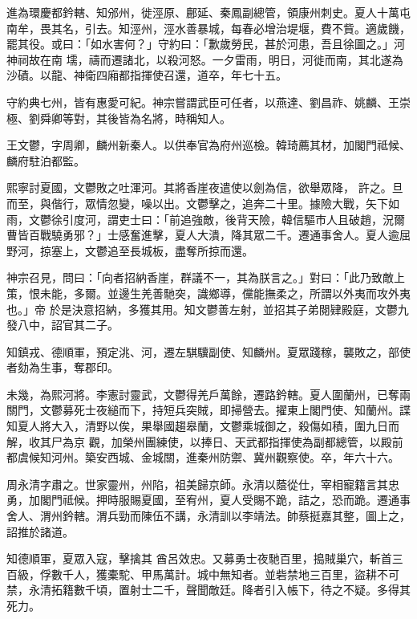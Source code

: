 \begin{pinyinscope}
 進為環慶都鈐轄、知邠州，徙涇原、鄜延、秦鳳副總管，領康州刺史。夏人十萬屯南牟，畏其名，引去。知涇州，涇水善暴城，每春必增治堤堰，費不貲。適歲饑，罷其役。或曰：「如水害何？」守約曰：「歉歲勞民，甚於河患，吾且徐圖之。」河神祠故在南
 壖，禱而遷諸北，以殺河怒。一夕雷雨，明日，河徙而南，其北遂為沙磧。以龍、神衛四廂都指揮使召還，道卒，年七十五。



 守約典七州，皆有惠愛可紀。神宗嘗謂武臣可任者，以燕達、劉昌祚、姚麟、王崇極、劉舜卿等對，其後皆為名將，時稱知人。



 王文鬱，字周卿，麟州新秦人。以供奉官為府州巡檢。韓琦薦其材，加閣門祗候、麟府駐泊都監。



 熙寧討夏國，文鬱敗之吐渾河。其將香崖夜遣使以劍為信，欲舉眾降，
 許之。旦而至，與偕行，眾情忽變，噪以出。文鬱擊之，追奔二十里。據險大戰，矢下如雨，文鬱徐引度河，謂吏士曰：「前追強敵，後背天險，韓信驅市人且破趙，況爾曹皆百戰驍勇邪？」士感奮進擊，夏人大潰，降其眾二千。遷通事舍人。夏人逾屈野河，掠塞上，文鬱追至長城板，盡奪所掠而還。



 神宗召見，問曰：「向者招納香崖，群議不一，其為朕言之。」對曰：「此乃致敵上策，恨未能，多爾。並邊生羌善馳突，識鄉導，儻能撫柔之，所謂以外夷而攻外夷也。」帝
 於是決意招納，多獲其用。知文鬱善左射，並招其子弟閱肄殿庭，文鬱九發八中，詔官其二子。



 知鎮戎、德順軍，預定洮、河，遷左騏驥副使、知麟州。夏眾踐稼，襲敗之，部使者劾為生事，奪郡印。



 未幾，為熙河將。李憲討靈武，文鬱得羌戶萬餘，遷路鈐轄。夏人圍蘭州，已奪兩關門，文鬱募死士夜縋而下，持短兵突賊，即掃營去。擢東上閣門使、知蘭州。諜知夏人將大入，清野以俟，果舉國趨皋蘭，文鬱乘城御之，殺傷如積，圍九日而解，收其尸為京
 觀，加榮州團練使，以捧日、天武都指揮使為副都總管，以殿前都虞候知河州。築安西城、金城關，進秦州防禦、冀州觀察使。卒，年六十六。



 周永清字肅之。世家靈州，州陷，祖美歸京師。永清以蔭從仕，宰相寵籍言其忠勇，加閣門祗候。押時服賜夏國，至宥州，夏人受賜不跪，詰之，恐而跪。遷通事舍人、渭州鈐轄。渭兵勁而陳伍不講，永清訓以李靖法。帥蔡挺嘉其整，圖上之，詔推於諸道。



 知德順軍，夏眾入寇，擊擒其
 酋呂效忠。又募勇士夜馳百里，搗賊巢穴，斬首三百級，俘數千人，獲橐駝、甲馬萬計。城中無知者。並砦禁地三百里，盜耕不可禁，永清拓籍數千頃，置射士二千，聲聞敵廷。降者引入帳下，待之不疑。多得其死力。




\end{pinyinscope}
